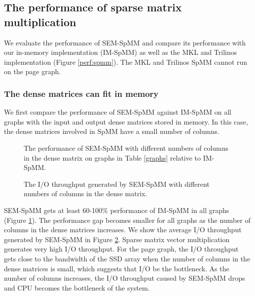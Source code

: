 \subsection{The performance of sparse matrix multiplication}

We evaluate the performance of SEM-SpMM and compare its performance with
our in-memory implementation (IM-SpMM) as well as the MKL and Trilinos
implementation (Figure \ref{perf:spmm}). The MKL and Trilinos SpMM cannot run
on the page graph.

\subsubsection{The dense matrices can fit in memory}

We first compare the performance of SEM-SpMM against IM-SpMM on all graphs with
the input and output dense matrices stored in memory. In this case, the dense
matrices involved in SpMM have a small number of columns.

\begin{figure}
	\begin{center}
		\footnotesize
		
		\caption{The performance of SEM-SpMM with different numbers of columns
			in the dense matrix on graphs in Table \ref{graphs} relative to IM-SpMM.}
		\label{perf:spmm_comp}
	\end{center}
\end{figure}

\begin{figure}
	\begin{center}
		\footnotesize
		
		\caption{The I/O throughput generated by SEM-SpMM with different numbers of
		columns in the dense matrix.}
		\label{perf:spmm_IO}
	\end{center}
\end{figure}

SEM-SpMM gets at least 60-100\% performance of IM-SpMM in all graphs (Figure
\ref{perf:spmm_comp}). The performance gap becomes smaller for all graphs as
the number of columns in the dense matrices increases.
We show the average I/O throughput generated by SEM-SpMM in
Figure \ref{perf:spmm_IO}. Sparse matrix vector multiplication generates very high I/O
throughput. For the page graph, the I/O throughput gets close to the bandwidth
of the SSD array when the number of columns in the dense matrices is small,
which suggests that I/O be the bottleneck. As the number of columns increases,
the I/O throughput caused by SEM-SpMM drops and CPU becomes the bottleneck of
the system.

